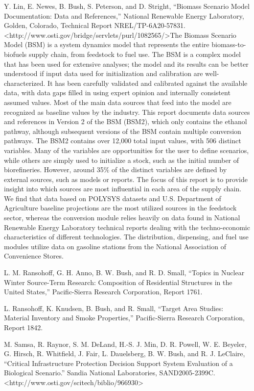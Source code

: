 \documentclass[]{article}
\begin{document}
Y. Lin, E. Newes, B. Bush, S. Peterson, and D. Stright, ``Biomass
Scenario Model Documentation: Data and References,'' National Renewable
Energy Laboratory, Golden, Colorado, Technical Report
NREL/TP-6A20-57831.
\textless{}http://www.osti.gov/bridge/servlets/purl/1082565/\textgreater{}The
Biomass Scenario Model (BSM) is a system dynamics model that represents
the entire biomass-to-biofuels supply chain, from feedstock to fuel use.
The BSM is a complex model that has been used for extensive analyses;
the model and its results can be better understood if input data used
for initialization and calibration are well-characterized. It has been
carefully validated and calibrated against the available data, with data
gaps filled in using expert opinion and internally consistent assumed
values. Most of the main data sources that feed into the model are
recognized as baseline values by the industry. This report documents
data sources and references in Version 2 of the BSM (BSM2), which only
contains the ethanol pathway, although subsequent versions of the BSM
contain multiple conversion pathways. The BSM2 contains over 12,000
total input values, with 506 distinct variables. Many of the variables
are opportunities for the user to define scenarios, while others are
simply used to initialize a stock, such as the initial number of
biorefineries. However, around 35\% of the distinct variables are
defined by external sources, such as models or reports. The focus of
this report is to provide insight into which sources are most
influential in each area of the supply chain. We find that data based on
POLYSYS datasets and U.S. Department of Agriculture baseline projections
are the most utilized sources in the feedstock sector, whereas the
conversion module relies heavily on data found in National Renewable
Energy Laboratory technical reports dealing with the techno-economic
characteristics of different technologies. The distribution, dispensing,
and fuel use modules utilize data on gasoline stations from the National
Association of Convenience Stores.

L. M. Ransohoff, G. H. Anno, B. W. Bush, and R. D. Small, ``Topics in
Nuclear Winter Source-Term Research: Composition of Residential
Structures in the United States,'' Pacific-Sierra Research Corporation,
Report 1761.

L. Ransohoff, K. Knudsen, B. Bush, and R. Small, ``Target Area Studies:
Material Inventory and Smoke Properties,'' Pacific-Sierra Research
Corporation, Report 1842.

M. Samsa, R. Raynor, S. M. DeLand, H.-S. J. Min, D. R. Powell, W. E.
Beyeler, G. Hirsch, R. Whitfield, J. Fair, L. Dauelsberg, B. W. Bush,
and R. J. LeClaire, ``Critical Infrastructure Protection Decision
Support System Evaluation of a Biological Scenario.'' Sandia National
Laboratories, SAND2005-2399C.
\textless{}http://www.osti.gov/scitech/biblio/966930\textgreater{}
\end{document}
